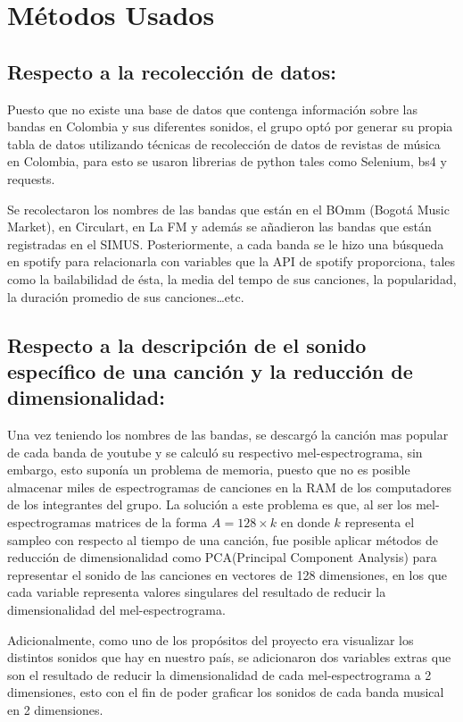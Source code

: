 \documentclass[11pt]{article}
\begin{document}
\section{Métodos Usados}
\label{sec:org5435710}
\subsection{Respecto a la recolección de datos:}
\label{sec:orgc0bf7ed}
Puesto que no existe una base de datos que contenga información sobre las bandas
en Colombia y sus diferentes sonidos, el grupo optó por generar su propia tabla
de datos utilizando técnicas de recolección de datos  de revistas de música en
Colombia, para esto se usaron librerias de python tales como Selenium, bs4 y
requests.

Se recolectaron los nombres de las bandas que están en el BOmm (Bogotá Music
Market), en Circulart, en La FM y además se añadieron las bandas que están
registradas en el SIMUS. Posteriormente, a cada banda se le hizo una búsqueda en
spotify para relacionarla con variables que la API de spotify proporciona, tales
como la bailabilidad de ésta, la media del tempo de sus canciones, la
popularidad, la duración promedio de sus canciones\ldots{}etc.

\subsection{Respecto a la descripción de el sonido específico de una canción y la reducción de dimensionalidad:}
\label{sec:org047a9a6}
Una vez teniendo los nombres de las bandas, se descargó la canción mas popular
de cada banda de youtube y se calculó su respectivo mel-espectrograma, sin
embargo, esto suponía un problema de memoria, puesto que no es posible almacenar
miles de espectrogramas de canciones en la RAM de los computadores de los
integrantes del grupo. La solución a este problema es que, al ser los
mel-espectrogramas matrices de la forma \(A=128\times k\) en donde \(k\) representa
el sampleo con respecto al tiempo de una canción, fue posible aplicar métodos
de reducción de dimensionalidad como PCA(Principal Component Analysis) para
representar el sonido de las canciones en vectores de 128 dimensiones, en los
que cada variable representa valores singulares del resultado de reducir la
dimensionalidad del mel-espectrograma.

Adicionalmente, como uno de los propósitos del proyecto era visualizar los
distintos sonidos que hay en nuestro país, se adicionaron dos variables extras
que son el resultado de reducir la dimensionalidad de cada mel-espectrograma a 2
dimensiones, esto con el fin de poder graficar los sonidos de cada banda musical
en 2 dimensiones.
\end{document}
